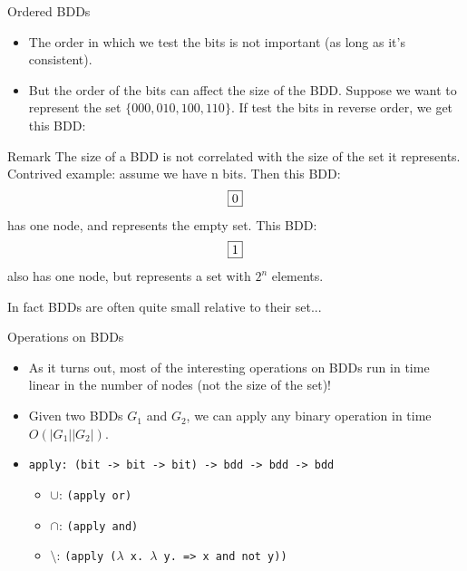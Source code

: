 \documentclass{beamer}
\begin{document}
\begin{frame}{Ordered BDDs}
\begin{itemize}
\item The order in which we test the bits is not important (as long as it's
consistent).
\item But the order of the bits can affect the size of the BDD. Suppose we
want to represent the set $\{000, 010, 100, 110\}$. If test the bits in
reverse order, we get this BDD: 

\end{itemize}
\end{frame}

\begin{frame}{Remark}
The size of a BDD is not correlated with the size of the set it represents.
Contrived example: assume we have n bits. Then this BDD:
$$\fbox{0}$$
has one node, and represents the empty set. This BDD:
$$\fbox{1}$$
also has one node, but represents a set with $2^n$ elements.

In fact BDDs are often quite small relative to their set...
\end{frame}

\begin{frame}{Operations on BDDs}
\begin{itemize}
\item As it turns out, most of the interesting operations on BDDs run in
time linear in the number of nodes (not the size of the set)!
\item Given two BDDs $G_1$ and $G_2$, we can apply any binary operation 
in time $O(|G_1||G_2|)$. 
\item {\tt apply: (bit -> bit -> bit) -> bdd -> bdd -> bdd} 
    \begin{itemize}
        \item $\cup$: {\tt (apply or)} 
        \item $\cap$: {\tt (apply and)} 
        \item $\setminus$: {\tt (apply ($\lambda$ x. $\lambda$ y. => x and not y))}
    \end{itemize}
\end{itemize}
\end{frame}
\end{document}
